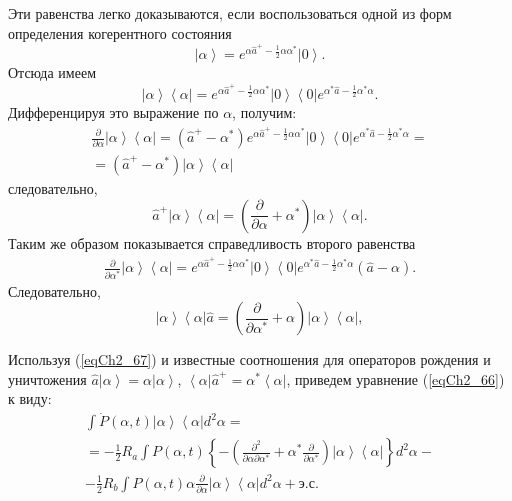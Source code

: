 Эти равенства легко доказываются, если воспользоваться одной из форм
определения когерентного состояния
\[
\left|\alpha\right> = e^{\alpha \hat{a}^{+} -
  \frac{1}{2}\alpha\alpha^{*}} \left|0\right>.
\]
Отсюда имеем 
\[
\left|\alpha\right>\left<\alpha\right| = e^{\alpha \hat{a}^{+} -
  \frac{1}{2}\alpha\alpha^{*}} \left|0\right>
\left<0\right|e^{\alpha^{*} \hat{a} -
  \frac{1}{2}\alpha^{*}\alpha}.
\]
Дифференцируя это выражение по $\alpha$,  получим:
\begin{eqnarray}
\frac{\partial}{\partial \alpha}\left|\alpha\right>\left<\alpha\right|
= \left(\hat{a}^{+} -
\alpha^{*}\right) e^{\alpha \hat{a}^{+} -
  \frac{1}{2}\alpha\alpha^{*}} \left|0\right>
\left<0\right|e^{\alpha^{*} \hat{a} -
  \frac{1}{2}\alpha^{*}\alpha} = 
\nonumber \\
= \left(\hat{a}^{+} -
\alpha^{*}\right)\left|\alpha\right>\left<\alpha\right| 
\nonumber
\end{eqnarray}
следовательно,
\begin{equation}
\hat{a}^{+}\left|\alpha\right>\left<\alpha\right| = 
\left(\frac{\partial}{\partial \alpha} +
\alpha^{*}\right)\left|\alpha\right>\left<\alpha\right|.
\label{eqCh2_68}
\end{equation}
Таким же образом показывается справедливость второго равенства
\begin{eqnarray}
\frac{\partial}{\partial \alpha^{*}}\left|\alpha\right>\left<\alpha\right|
=  e^{\alpha \hat{a}^{+} -
  \frac{1}{2}\alpha\alpha^{*}} \left|0\right>
\left<0\right|e^{\alpha^{*} \hat{a} -
  \frac{1}{2}\alpha^{*}\alpha} 
\left(\hat{a} -
\alpha\right). 
\nonumber
\end{eqnarray}
Следовательно,
\begin{equation}
\left|\alpha\right>\left<\alpha\right|\hat{a} = 
\left(\frac{\partial}{\partial \alpha^{*}} +
\alpha\right)\left|\alpha\right>\left<\alpha\right|, 
\label{eqCh2_68a}
\end{equation}

Используя (\ref{eqCh2_67}) и известные соотношения для операторов рождения и
уничтожения  $\hat{a}\left|\alpha\right> = \alpha\left|\alpha\right>$,
$\left<\alpha\right|\hat{a}^{+} = \alpha^{*}\left<\alpha\right|$,
приведем уравнение (\ref{eqCh2_66}) к виду:   
\begin{eqnarray}
\int \dot{P}\left(\alpha,
t\right)\left|\alpha\right>\left<\alpha\right| d^2 \alpha  = 
\nonumber \\
= -\frac{1}{2}R_a\int
P\left(\alpha,t\right)
\left\{
-\left(
\frac{\partial^2}{\partial \alpha \partial \alpha^{*}} +
\alpha^{*}\frac{\partial}{\partial \alpha^{*}}
\right)
\left|\alpha\right>\left<\alpha\right| 
\right\}
d^2 \alpha - 
\nonumber \\
-\frac{1}{2}R_b\int P\left(\alpha,t\right)
\alpha \frac{\partial}{\partial \alpha}
\left|\alpha\right>\left<\alpha\right| 
d^2 \alpha + \mbox{э.с.}
\label{eqCh2_69}
\end{eqnarray}

